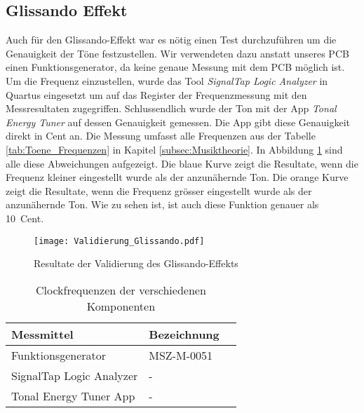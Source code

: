 \subsection{Glissando Effekt}\label{subsec:Glissando_Effekt}
Auch für den Glissando-Effekt war es nötig einen Test durchzuführen um die Genauigkeit der Töne festzustellen. Wir verwendeten dazu anstatt unseres PCB einen Funktionsgenerator, da keine genaue Messung mit dem PCB möglich ist. Um die Frequenz einzustellen, wurde das Tool \textit{SignalTap Logic Analyzer} in Quartus eingesetzt um auf das Register der Frequenzmessung mit den Messresultaten zugegriffen. Schlussendlich wurde der Ton mit der App \textit{Tonal Energy Tuner} auf dessen Genauigkeit gemessen. Die App gibt diese Genauigkeit direkt in Cent an. Die Messung umfasst alle Frequenzen aus der Tabelle \ref{tab:Toene_Frequenzen} in Kapitel \ref{subsec:Musiktheorie}. In Abbildung \ref{img:Validierung_Glissando} sind alle diese Abweichungen aufgezeigt. Die blaue Kurve  zeigt die Resultate, wenn die Frequenz kleiner eingestellt wurde als der anzunähernde Ton. Die orange Kurve zeigt die Resultate, wenn die Frequenz grösser eingestellt wurde als der anzunähernde Ton. Wie zu sehen ist, ist auch diese Funktion genauer als \SI{10}{Cent}.


\begin{figure}[h!]
	\centering
	\texttt{[image: Validierung\_Glissando.pdf]}
	\caption{Resultate der Validierung des Glissando-Effekts} 
	\label{img:Validierung_Glissando}
\end{figure}  

\begin{table}[H]
	\centering
	\caption{Clockfrequenzen der verschiedenen Komponenten}
	\label{tab:clocks}
	\begin{tabular}{l|l|l}
		\textbf{Messmittel} & \textbf{Bezeichnung} \\
		\hline\hline
		Funktionsgenerator & MSZ-M-0051   \\ \hline
		SignalTap Logic Analyzer & -    \\ \hline
		Tonal Energy Tuner App &  -   \\ \hline
		
	\end{tabular}
\end{table}

